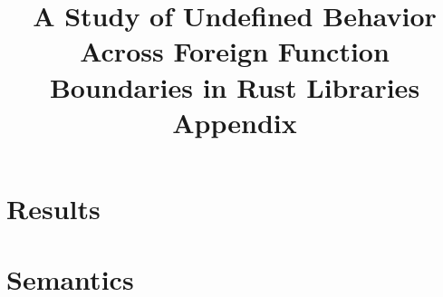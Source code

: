 \documentclass{article}
\title{A Study of Undefined Behavior Across Foreign Function Boundaries in Rust Libraries\\
\large Appendix}
\begin{document}
\maketitle
\tableofcontents

\section{Results}
\label{appendix:results}


\section{Semantics}
\label{appendix:semantics}

\end{document}
